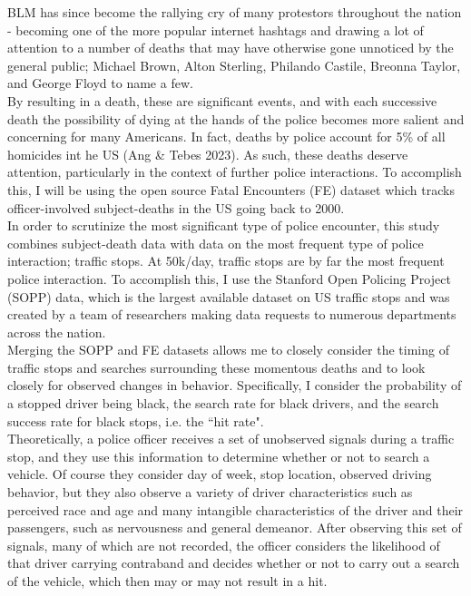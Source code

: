 \documentclass[12pt,a4paper]{article}
\begin{document}
BLM has since become the rallying cry of many protestors throughout the nation - becoming one of the more popular internet hashtags and drawing a lot of attention to a number of deaths that may have otherwise gone unnoticed by the general public; Michael Brown, Alton Sterling, Philando Castile, Breonna Taylor, and George Floyd to name a few. \\

By resulting in a death, these are significant events, and with each successive death the possibility of dying at the hands of the police becomes more salient and concerning for many Americans. In fact, deaths by police account for 5\% of all homicides int he US (Ang \& Tebes 2023). As such, these deaths deserve attention, particularly in the context of further police interactions. To accomplish this, I will be using the open source Fatal Encounters (FE) dataset which tracks officer-involved subject-deaths in the US going back to 2000. \\

In order to scrutinize the most significant type of police encounter, this study combines subject-death data with data on the most frequent type of police interaction; traffic stops. At 50k/day, traffic stops are by far the most frequent police interaction. To accomplish this, I use the Stanford Open Policing Project (SOPP) data, which is the largest available dataset on US traffic stops and was created by a team of researchers making data requests to numerous departments across the nation. \\

Merging the SOPP and FE datasets allows me to closely consider the timing of traffic stops and searches surrounding these momentous deaths and to look closely for observed changes in behavior. Specifically, I consider the probability of a stopped driver being black, the search rate for black drivers, and the search success rate for black stops, i.e. the ``hit rate". \\

Theoretically, a police officer receives a set of unobserved signals during a traffic stop, and they use this information to determine whether or not to search a vehicle. Of course they consider day of week, stop location, observed driving behavior, but they also observe a variety of driver characteristics such as perceived race and age and many intangible characteristics of the driver and their passengers, such as nervousness and general demeanor. After observing this set of signals, many of which are not recorded, the officer considers the likelihood of that driver carrying contraband and decides whether or not to carry out a search of the vehicle, which then may or may not result in a hit. \\
\end{document}
